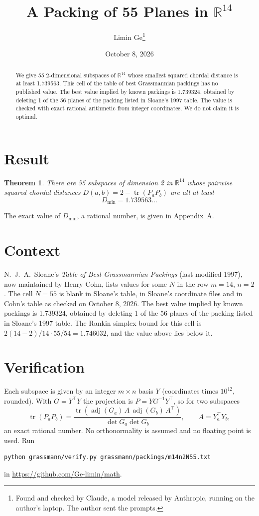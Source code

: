 \documentclass[11pt,a4paper]{article}
\title{A Packing of 55 Planes in $\mathbb{R}^{14}$}
\author{Limin Ge\thanks{Found and checked by Claude, a model released by Anthropic, running on the author's laptop. The author sent the prompts.}}
\date{October 8, 2026}
\newtheorem*{theorem}{Theorem}
\begin{document}
\maketitle
\begin{abstract}
We give 55 2-dimensional subspaces of $\mathbb{R}^{14}$ whose smallest squared chordal distance is at least 1.739563. This cell of the table of best Grassmannian packings has no published value. The best value implied by known packings is 1.739324, obtained by deleting 1 of the 56 planes of the packing listed in Sloane's 1997 table. The value is checked with exact rational arithmetic from integer coordinates. We do not claim it is optimal.
\end{abstract}

\section{Result}
\begin{theorem}
There are 55 subspaces of dimension 2 in $\mathbb{R}^{14}$ whose pairwise squared chordal distances $D(a,b) = 2 - \operatorname{tr}(P_aP_b)$ are all at least
\[ D_{\min} = 1.739563\ldots \]
\end{theorem}
The exact value of $D_{\min}$, a rational number, is given in Appendix~A.


\section{Context}
N.~J.~A.~Sloane's \emph{Table of Best Grassmannian Packings} (last modified 1997), now maintained by Henry Cohn, lists values for some $N$ in the row $m=14$, $n=2$. The cell $N=55$ is blank in Sloane's table, in Sloane's coordinate files and in Cohn's table as checked on October 8, 2026. The best value implied by known packings is 1.739324, obtained by deleting 1 of the 56 planes of the packing listed in Sloane's 1997 table. The Rankin simplex bound for this cell is $2(14-2)/14\cdot 55/54 = 1.746032$, and the value above lies below it.


\section{Verification}
Each subspace is given by an integer $m\times n$ basis $Y$ (coordinates times $10^{12}$, rounded). With $G=Y^\top Y$ the projection is $P=YG^{-1}Y^\top$, so for two subspaces
\[ \operatorname{tr}(P_aP_b)=\frac{\operatorname{tr}(\operatorname{adj}(G_a)\,A\,\operatorname{adj}(G_b)\,A^\top)}{\det G_a\det G_b},\qquad A=Y_a^\top Y_b, \]
an exact rational number. No orthonormality is assumed and no floating point is used. Run
\begin{verbatim}
python grassmann/verify.py grassmann/packings/m14n2N55.txt
\end{verbatim}
in \url{https://github.com/Ge-limin/math}.
\end{document}
